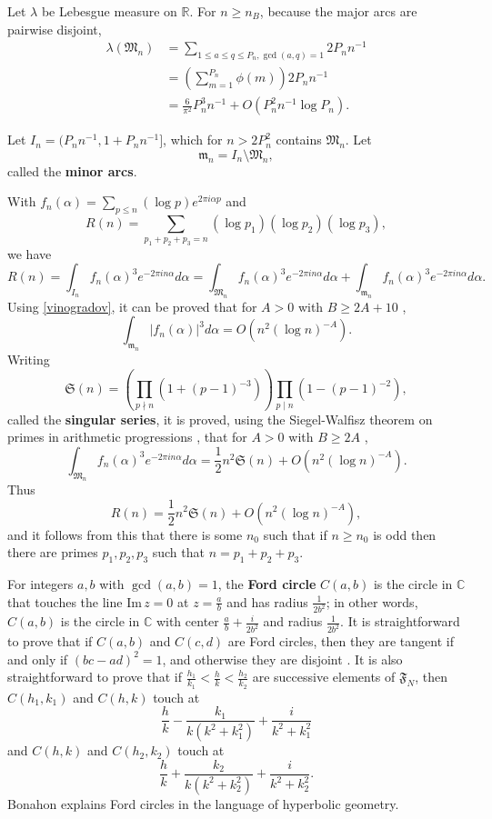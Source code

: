 \documentclass{article}
\def\Im{\ensuremath{\mathrm{Im}}\,}
\begin{document}
Let $\lambda$ be Lebesgue measure on $\mathbb{R}$.
For $n \geq n_B$, because the major arcs are pairwise disjoint,
\begin{align*}
\lambda(\mathfrak{M}_n)&=\sum_{1 \leq a \leq q \leq P_n, \gcd(a,q)=1} 2P_n n^{-1}\\
&=\left( \sum_{m=1}^{P_n} \phi(m) \right) 2P_n n^{-1}\\
&=\frac{6}{\pi^2} P_n^3 n^{-1} + O(P_n^2 n^{-1} \log P_n).
\end{align*} 

Let $I_n = (P_nn^{-1},1+P_nn^{-1}]$, which
for $n>2P_n^2$
 contains  $\mathfrak{M}_n$. Let
\[
\mathfrak{m}_n=I_n \setminus \mathfrak{M}_n,
\]
called the \textbf{minor arcs}.

With $f_n(\alpha) = \sum_{p \leq n} (\log p) e^{2\pi i\alpha p}$ and 
\[
R(n) = \sum_{p_1+p_2+p_3=n} (\log p_1) (\log p_2) (\log p_3),
\]
we have
\[
R(n)=\int_{I_n} f_n(\alpha)^3 e^{-2\pi in\alpha} d\alpha
=\int_{\mathfrak{M}_n}  f_n(\alpha)^3 e^{-2\pi in\alpha} d\alpha
+\int_{\mathfrak{m}_n}  f_n(\alpha)^3 e^{-2\pi in\alpha} d\alpha.
\]
Using \eqref{vinogradov}, it can be proved that for $A>0$ with $B \geq 2A+10$ \cite[p.~29, Theorem 3.2]{vaughan},
\[
\int_{\mathfrak{m}_n} |f_n(\alpha)|^3 d\alpha = O(n^2 (\log n)^{-A}).
\]
Writing 
\[
\mathfrak{S}(n) = \left( \prod_{p \nmid n} (1+(p-1)^{-3}) \right) \prod_{p \mid n} (1-(p-1)^{-2}),
\]
called the \textbf{singular series}, it is proved, using the Siegel-Walfisz theorem on primes in arithmetic progressions \cite[p.~381, Corollary
11.19]{multiplicative}, that 
for $A>0$ with $B \geq 2A$ \cite[p.~31, Theorem 3.3]{vaughan},
\[
\int_{\mathfrak{M}_n} f_n(\alpha)^3 e^{-2\pi in\alpha} d\alpha = \frac{1}{2} n^2 \mathfrak{S}(n) + O(n^2(\log n)^{-A}).
\]
Thus
\[
R(n) = \frac{1}{2} n^2 \mathfrak{S}(n) + O(n^2(\log n)^{-A}),
\]
and it follows from this  that there is some $n_0$ such that if $n \geq n_0$ is odd then there are primes
$p_1,p_2,p_3$ such that $n=p_1+p_2+p_3$. 

For integers $a,b$ with $\gcd(a,b)=1$, the \textbf{Ford circle} $C(a,b)$ is the circle in $\mathbb{C}$ 
that touches the line $\Im z=0$ at $z=\frac{a}{b}$ and has radius $\frac{1}{2b^2}$; in other words, $C(a,b)$ is the circle in $\mathbb{C}$
with center $\frac{a}{b}+\frac{i}{2b^2}$ and radius
$\frac{1}{2b^2}$.
It is straightforward to prove that if $C(a,b)$ and $C(c,d)$ are Ford circles, then they are tangent if and only if $(bc-ad)^2=1$, and
otherwise they are disjoint \cite[p.~100, Theorem 5.6]{apostol}. It is also straightforward to prove \cite[p.~101, Theorem 5.7]{apostol} that if 
$\frac{h_1}{k_1} < \frac{h}{k} < \frac{h_2}{k_2}$ are successive elements of $\mathfrak{F}_N$, then 
$C(h_1,k_1)$ and $C(h,k)$ touch at
\[
\frac{h}{k} - \frac{k_1}{k(k^2+k_1^2)} + \frac{i}{k^2+k_1^2}
\]
and  $C(h,k)$ and $C(h_2,k_2)$ touch at
\[
\frac{h}{k} + \frac{k_2}{k(k^2+k_2^2)} + \frac{i}{k^2+k_2^2}.
\]
Bonahon \cite[pp.~207 ff., Chapter 8]{bonahon} explains Ford circles in the language of hyperbolic geometry.
\end{document}

